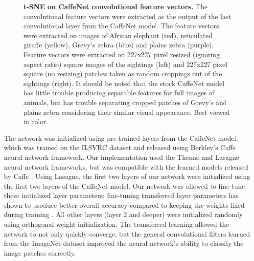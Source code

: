 \begin{figure}[t]%
	\centering
    	\caption[t-SNE on CaffeNet Concolutional Feature Vectors]{\textbf{t-SNE on CaffeNet convolutional feature vectors.}  The convolutional feature vectors were extracted as the output of the last convolutional layer from the CaffeNet model.  The feature vectors were extracted on images of African elephant (red), reticulated giraffe (yellow), Grevy's zebra (blue) and plains zebra (purple).  Feature vectors were extracted on 227x227 pixel resized (ignoring aspect ratio) square images of the sightings (left) and 227x227 pixel square (no resizing) patches taken as random croppings out of the sightings (right).  It should be noted that the stock CaffeNet model has little trouble producing separable features for full images of animals, but has trouble separating cropped patches of Grevy's and plains zebra considering their similar visual appearance.  Best viewed in color.}
    	\label{fig:tsne}
\end{figure}

The network was initialized using pre-trained layers from the CaffeNet model, which was trained on the ILSVRC dataset \cite{russakovsky_imagenet_2014} and released using Berkley's Caffe \cite{jia_caffe:_2014} neural network framework.  Our implementation used the Theano and Lasagne neural network frameworks, but was compatible with the learned models released by Caffe \cite{_https://github.com/kitofans/caffe-theano-conversion_2015}.  Using Lasagne, the first two layers of our network were initialized using the first two layers of the CaffeNet model.  Our network was allowed to fine-tune these initialized layer parameters; fine-tuning transferred layer parameters has shown to produce better overall accuracy compared to keeping the weights fixed during training \cite{yosinski_how_2014}.  All other layers (layer 2 and deeper) were initialized randomly using orthogonal weight initialization.  The transferred learning \cite{oquab_learning_2013} allowed the network to not only quickly converge, but the general convolutional filters learned from the ImageNet dataset improved the neural network's ability to classify the image patches correctly.


